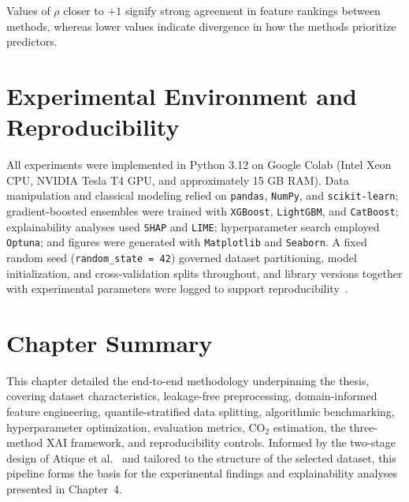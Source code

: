Values of $\rho$ closer to $+1$ signify strong agreement in feature rankings between methods, whereas lower values indicate divergence in how the methods prioritize predictors.


\section{Experimental Environment and Reproducibility}

All experiments were implemented in Python 3.12 on Google Colab (Intel Xeon CPU, NVIDIA Tesla T4 GPU, and approximately 15 GB RAM). Data manipulation and classical modeling relied on \texttt{pandas}, \texttt{NumPy}, and \texttt{scikit-learn}; gradient-boosted ensembles were trained with \texttt{XGBoost}, \texttt{LightGBM}, and \texttt{CatBoost}; explainability analyses used \texttt{SHAP} and \texttt{LIME}; hyperparameter search employed \texttt{Optuna}; and figures were generated with \texttt{Matplotlib} and \texttt{Seaborn}. A fixed random seed (\texttt{random\_state = 42}) governed dataset partitioning, model initialization, and cross-validation splits throughout, and library versions together with experimental parameters were logged to support reproducibility~\cite{atique2026explainable}.


\section{Chapter Summary}

This chapter detailed the end-to-end methodology underpinning the thesis, covering dataset characteristics, leakage-free preprocessing, domain-informed feature engineering, quantile-stratified data splitting, algorithmic benchmarking, hyperparameter optimization, evaluation metrics, CO$_2$ estimation, the three-method XAI framework, and reproducibility controls. Informed by the two-stage design of Atique et al.~\cite{atique2026explainable} and tailored to the structure of the selected dataset, this pipeline forms the basis for the experimental findings and explainability analyses presented in Chapter~4.
